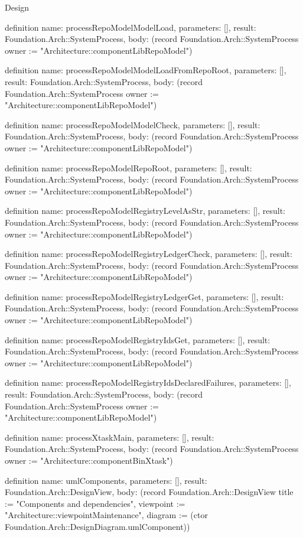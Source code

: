 \begin{lexlean}{Design}
\begin{semanticmodule}
definition{
  name: processRepoModelModelLoad,
  parameters: [],
  result: Foundation.Arch::SystemProcess,
  body: (record Foundation.Arch::SystemProcess {owner := "Architecture::componentLibRepoModel"})
}

definition{
  name: processRepoModelModelLoadFromRepoRoot,
  parameters: [],
  result: Foundation.Arch::SystemProcess,
  body: (record Foundation.Arch::SystemProcess {owner := "Architecture::componentLibRepoModel"})
}

definition{
  name: processRepoModelModelCheck,
  parameters: [],
  result: Foundation.Arch::SystemProcess,
  body: (record Foundation.Arch::SystemProcess {owner := "Architecture::componentLibRepoModel"})
}

definition{
  name: processRepoModelRepoRoot,
  parameters: [],
  result: Foundation.Arch::SystemProcess,
  body: (record Foundation.Arch::SystemProcess {owner := "Architecture::componentLibRepoModel"})
}

definition{
  name: processRepoModelRegistryLevelAsStr,
  parameters: [],
  result: Foundation.Arch::SystemProcess,
  body: (record Foundation.Arch::SystemProcess {owner := "Architecture::componentLibRepoModel"})
}

definition{
  name: processRepoModelRegistryLedgerCheck,
  parameters: [],
  result: Foundation.Arch::SystemProcess,
  body: (record Foundation.Arch::SystemProcess {owner := "Architecture::componentLibRepoModel"})
}

definition{
  name: processRepoModelRegistryLedgerGet,
  parameters: [],
  result: Foundation.Arch::SystemProcess,
  body: (record Foundation.Arch::SystemProcess {owner := "Architecture::componentLibRepoModel"})
}

definition{
  name: processRepoModelRegistryIdsGet,
  parameters: [],
  result: Foundation.Arch::SystemProcess,
  body: (record Foundation.Arch::SystemProcess {owner := "Architecture::componentLibRepoModel"})
}

definition{
  name: processRepoModelRegistryIdsDeclaredFailures,
  parameters: [],
  result: Foundation.Arch::SystemProcess,
  body: (record Foundation.Arch::SystemProcess {owner := "Architecture::componentLibRepoModel"})
}

definition{
  name: processXtaskMain,
  parameters: [],
  result: Foundation.Arch::SystemProcess,
  body: (record Foundation.Arch::SystemProcess {owner := "Architecture::componentBinXtask"})
}

definition{
  name: umlComponents,
  parameters: [],
  result: Foundation.Arch::DesignView,
  body: (record Foundation.Arch::DesignView {title := "Components and dependencies", viewpoint := "Architecture::viewpointMaintenance", diagram := (ctor Foundation.Arch::DesignDiagram.umlComponent)})
}


\end{semanticmodule}
\end{lexlean}
